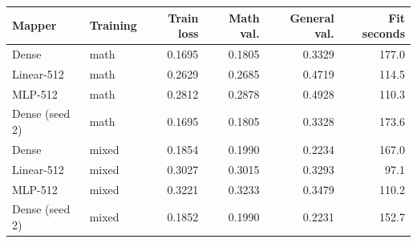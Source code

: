 \begin{tabular}{llrrrr}
\toprule
Mapper & Training & Train loss & Math val. & General val. & Fit seconds \\
\midrule
Dense & math & 0.1695 & 0.1805 & 0.3329 & 177.0 \\
Linear-512 & math & 0.2629 & 0.2685 & 0.4719 & 114.5 \\
MLP-512 & math & 0.2812 & 0.2878 & 0.4928 & 110.3 \\
Dense (seed 2) & math & 0.1695 & 0.1805 & 0.3328 & 173.6 \\
Dense & mixed & 0.1854 & 0.1990 & 0.2234 & 167.0 \\
Linear-512 & mixed & 0.3027 & 0.3015 & 0.3293 & 97.1 \\
MLP-512 & mixed & 0.3221 & 0.3233 & 0.3479 & 110.2 \\
Dense (seed 2) & mixed & 0.1852 & 0.1990 & 0.2231 & 152.7 \\
\bottomrule
\end{tabular}
